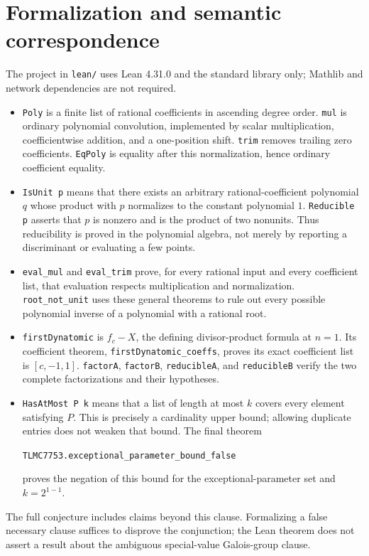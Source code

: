 \documentclass[11pt]{article}
\begin{document}
\section{Formalization and semantic correspondence}
The project in \texttt{lean/} uses Lean 4.31.0 and the standard library only; Mathlib and network dependencies are not required.

\begin{itemize}
\item \texttt{Poly} is a finite list of rational coefficients in ascending degree order. \texttt{mul} is ordinary polynomial convolution, implemented by scalar multiplication, coefficientwise addition, and a one-position shift. \texttt{trim} removes trailing zero coefficients. \texttt{EqPoly} is equality after this normalization, hence ordinary coefficient equality.
\item \texttt{IsUnit p} means that there exists an arbitrary rational-coefficient polynomial $q$ whose product with $p$ normalizes to the constant polynomial $1$. \texttt{Reducible p} asserts that $p$ is nonzero and is the product of two nonunits. Thus reducibility is proved in the polynomial algebra, not merely by reporting a discriminant or evaluating a few points.
\item \texttt{eval\_mul} and \texttt{eval\_trim} prove, for every rational input and every coefficient list, that evaluation respects multiplication and normalization. \texttt{root\_not\_unit} uses these general theorems to rule out every possible polynomial inverse of a polynomial with a rational root.
\item \texttt{firstDynatomic} is $f_c-X$, the defining divisor-product formula at $n=1$. Its coefficient theorem,
\texttt{firstDynatomic\_coeffs}, proves its exact coefficient list is $[c,-1,1]$. \texttt{factorA}, \texttt{factorB}, \texttt{reducibleA}, and \texttt{reducibleB} verify the two complete factorizations and their hypotheses.
\item \texttt{HasAtMost P k} means that a list of length at most $k$ covers every element satisfying $P$. This is precisely a cardinality upper bound; allowing duplicate entries does not weaken that bound. The final theorem
\begin{center}
\texttt{TLMC7753.exceptional\_parameter\_bound\_false}
\end{center}
proves the negation of this bound for the exceptional-parameter set and $k=2^{1-1}$.
\end{itemize}
The full conjecture includes claims beyond this clause. Formalizing a false necessary clause suffices to disprove the conjunction; the Lean theorem does not assert a result about the ambiguous special-value Galois-group clause.
\end{document}
